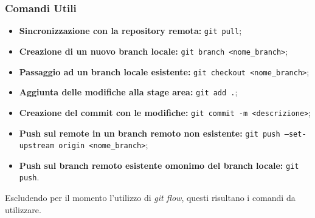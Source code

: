\documentclass[a4paper, 12pt]{article}
\begin{document}
\subsubsection{Comandi Utili}
\begin{itemize}
    \item \textbf{Sincronizzazione con la repository remota:} \texttt{git pull};
    \item \textbf{Creazione di un nuovo branch locale:} \texttt{git branch <nome\_branch>};
    \item \textbf{Passaggio ad un branch locale esistente:} \texttt{git checkout <nome\_branch>};
    \item \textbf{Aggiunta delle modifiche alla stage area:} \texttt{git add .};
    \item \textbf{Creazione del commit con le modifiche:} \texttt{git commit -m <descrizione>};
    \item \textbf{Push sul remote in un branch remoto non esistente:} \texttt{git push --set-upstream origin <nome\_branch>};
    \item \textbf{Push sul branch remoto esistente omonimo del branch locale:} \texttt{git push}.
\end{itemize}
Escludendo per il momento l'utilizzo di \textit{git flow}, questi risultano i comandi da utilizzare.
\end{document}
